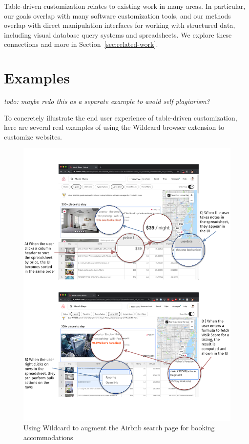 \documentclass[sigplan,10pt,anonymous,review]{acmart}
\begin{document}
Table-driven customization relates to existing work in many areas. In
particular, our goals overlap with many software customization tools,
and our methods overlap with direct manipulation interfaces for working
with structured data, including visual database query systems and
spreadsheets. We explore these connections and more in
Section~\ref{sec:related-work}.

\hypertarget{sec:examples}{%
\section{Examples}\label{sec:examples}}

\emph{todo: maybe redo this as a separate example to avoid self
plagiarism?}

To concretely illustrate the end user experience of table-driven
customization, here are several real examples of using the Wildcard
browser extension to customize websites.

\begin{figure}
\hypertarget{fig:airbnb-demo}{%
\centering
\includegraphics{media/airbnb-demo-300dpi.png}
\caption{Using Wildcard to augment the Airbnb search page for booking
accommodations}\label{fig:airbnb-demo}
}
\end{figure}
\end{document}
